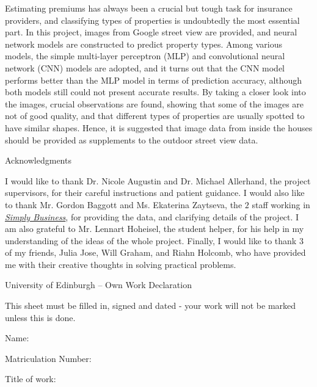 \documentclass[11pt,twoside]{article}
\numberwithin{Theorem}{section}
\numberwithin{Definition}{section}
\numberwithin{Lemma}{section}
\numberwithin{Algorithm}{section}
\numberwithin{equation}{section}
\newcommand{\dottedline}[1]{\makebox[#1]{.\dotfill}}
\begin{document}
Estimating premiums has always been a crucial but tough task for insurance providers, and classifying types of properties is undoubtedly the most essential part. In this project, images from Google street view are provided, and neural network models are constructed to predict property types. Among various models, the simple multi-layer perceptron (MLP) and convolutional neural network (CNN) models are adopted, and it turns out that the CNN model performs better than the MLP model in terms of prediction accuracy, although both models still could not present accurate results. By taking a closer look into the images, crucial observations are found, showing that some of the images are not of good quality, and that different types of properties are usually spotted to have similar shapes. Hence, it is suggested that image data from inside the houses should be provided as supplements to the outdoor street view data.

\clearpage

\begin{center}
\Large{Acknowledgments}
\end{center}

I would like to thank Dr. Nicole Augustin and Dr. Michael Allerhand, the project supervisors, for their careful instructions and patient guidance. I would also like to thank Mr. Gordon Baggott and Ms. Ekaterina Zaytseva, the $2$ staff working in \href{https://www.simplybusiness.co.uk/}{\textit{Simply Business}}, for providing the data, and clarifying details of the project. I am also grateful to Mr. Lennart Hoheisel, the student helper, for his help in my understanding of the ideas of the whole project. Finally, I would like to thank $3$ of my friends, Julia Jose, Will Graham, and Riahn Holcomb, who have provided me with their creative thoughts in solving practical problems.

\clearpage

\begin{center}
\Large{University of Edinburgh – Own Work Declaration}
\end{center}


This sheet must be filled in, signed and dated - your work will not be marked unless this is done.
\vspace{1cm}

Name: \dottedline{8cm}

Matriculation Number: \dottedline{6cm}

Title of work: \dottedline{8cm}

\vspace{1cm}
\end{document}
